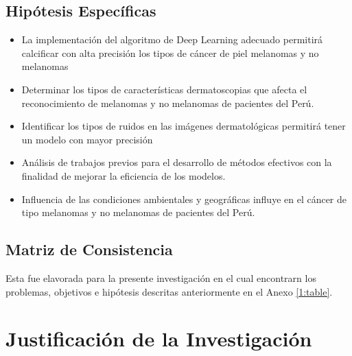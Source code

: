 \subsection{Hipótesis Específicas}
\newcommand{\Hone}{
	La implementación del algoritmo de Deep Learning adecuado permitirá calcificar con alta precisión los tipos de cáncer de piel melanomas y no melanomas
	
}
\newcommand{\Htwo}{
	Determinar los tipos de características dermatoscopias que afecta el reconocimiento de melanomas y no melanomas de pacientes del Perú.
	
}
\newcommand{\Hthree}{
	Identificar los tipos de ruidos en las imágenes dermatológicas permitirá tener un modelo con mayor precisión
		
}
\newcommand{\Hfour}{
	Análisis de trabajos previos para el desarrollo de métodos efectivos con la finalidad de mejorar la eficiencia de los modelos.
	
}
\newcommand{\Hfive}{
	Influencia de las condiciones ambientales y geográficas influye en el cáncer de tipo melanomas y no melanomas de pacientes del Perú.
}
\begin{itemize}
	\item \Hone
	\item \Htwo
	\item \Hthree
	\item \Hfour
	\item \Hfive
\end{itemize}

\subsection{Matriz de Consistencia}

Esta fue elavorada para la presente investigación en el cual encontrarn los problemas, objetivos e hipótesis descritas anteriormente en el Anexo \ref{1:table}.





\section{Justificación de la Investigación}

